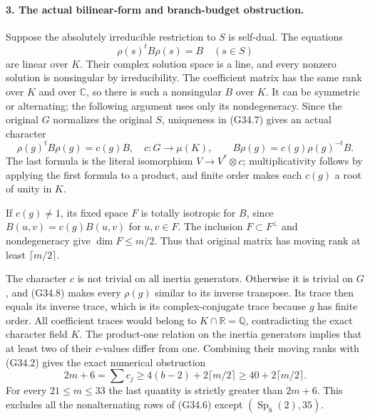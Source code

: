 \paragraph{3. The actual bilinear-form and branch-budget obstruction.}
Suppose the absolutely irreducible restriction to \(S\) is
self-dual. The equations
\[
                 \rho(s)^t B\rho(s)=B\quad(s\in S)       \tag{G34.7}
\]
are linear over \(K\). Their complex solution space is a line,
and every nonzero solution is nonsingular by irreducibility.
The coefficient matrix has the same rank over \(K\) and over
\(\mathbb C\), so there is such a nonsingular \(B\) over \(K\).
It can be symmetric or alternating; the following argument uses
only its nondegeneracy. Since the original \(G\) normalizes
the original \(S\), uniqueness in (G34.7) gives an actual
character
\[
 \rho(g)^tB\rho(g)=c(g)B,
 \quad c:G\longrightarrow\mu(K),\qquad
 B\rho(g)=c(g)\rho(g)^{-t}B.                            \tag{G34.8}
\]
The last formula is the literal isomorphism
\(V\to V^*\otimes c\); multiplicativity follows by applying
the first formula to a product, and finite order makes each
\(c(g)\) a root of unity in \(K\).

If \(c(g)\ne1\), its fixed space \(F\) is totally isotropic
for \(B\), since \(B(u,v)=c(g)B(u,v)\) for \(u,v\in F\).
The inclusion \(F\subset F^\perp\) and nondegeneracy give
\(\dim F\le m/2\). Thus that original matrix has moving rank
at least \(\lceil m/2\rceil\).

The character \(c\) is not trivial on all inertia generators.
Otherwise it is trivial on \(G\), and (G34.8) makes every
\(\rho(g)\) similar to its inverse transpose. Its trace then
equals its inverse trace, which is its complex-conjugate trace
because \(g\) has finite order. All coefficient traces would
belong to \(K\cap\mathbb R=\mathbb Q\), contradicting the
exact character field \(K\). The product-one relation on the
inertia generators implies that at least two of their
\(c\)-values differ from one. Combining their moving ranks
with (G34.2) gives the exact numerical obstruction
\[
 2m+6=\sum c_j
       \ge4(b-2)+2\lceil m/2\rceil
       \ge40+2\lceil m/2\rceil.                         \tag{G34.9}
\]
For every \(21\le m\le33\) the last quantity is strictly
greater than \(2m+6\). This excludes all the nonalternating
rows of (G34.6) except \((\operatorname{Sp}_8(2),35)\).

